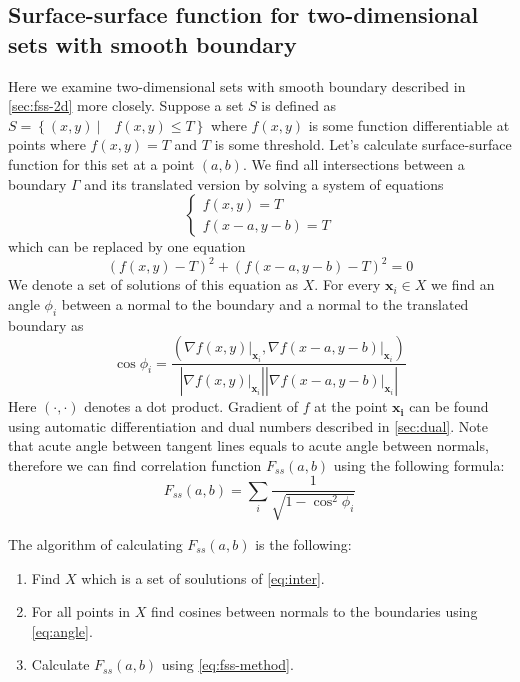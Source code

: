 \documentclass[reprint,amsmath,amssymb,aps,pre,showkeys,showpacs]{revtex4-1}
\begin{document}
\subsection{Surface-surface function for two-dimensional sets with smooth boundary}
\label{sec:cool-algo}
Here we examine two-dimensional sets with smooth boundary described in
\cref{sec:fss-2d} more closely. Suppose a set $S$ is defined as
$S = \left\{ (x, y) \ | \quad f(x, y) \le T \right\}$ where $f(x, y)$ is some function
differentiable at points where $f(x, y) = T$ and $T$ is some threshold. Let's
calculate surface-surface function for this set at a point $(a, b)$. We find all
intersections between a boundary $\Gamma$ and its translated version by solving a
system of equations
\begin{equation*}
  \left\{
  \begin{array}{l}
    f(x, y) = T \\
    f(x-a, y-b) = T    
  \end{array}
  \right.
\end{equation*}
which can be replaced by one equation
\begin{equation}
  (f(x, y) - T)^2 + (f(x-a, y-b) - T)^2 = 0 \label{eq:inter}
\end{equation}
We denote a set of solutions of this equation as $X$. For every $\bm{x}_i \in X$
we find an angle $\phi_i$ between a normal to the boundary and a normal to
the translated boundary as
\begin{equation}
  \cos \phi_i = \frac{(\nabla f(x,y) \vert_{\bm{x}_i}, \nabla f(x-a,y-b)
    \vert_{\bm{x}_i})}{|\nabla f(x,y) \vert_{\bm{x}_i}| |\nabla f(x-a,y-b)
    \vert_{\bm{x}_i}|} \label{eq:angle}
\end{equation}
Here $(\cdot, \cdot)$ denotes a dot product. Gradient of $f$ at the point
$\bm{x_i}$ can be found using automatic differentiation and dual numbers
described in \cref{sec:dual}. Note that acute angle between tangent lines equals
to acute angle between normals, therefore we can find correlation function
$F_{ss}(a, b)$ using the following formula:
\begin{equation}
  F_{ss}(a, b) = \sum_i \frac{1}{\sqrt{1 - \cos^2 \phi_i}} \label{eq:fss-method}
\end{equation}

The algorithm of calculating $F_{ss}(a, b)$ is the following:
\begin{enumerate}
\item Find $X$ which is a set of soulutions of \cref{eq:inter}.
\item For all points in $X$ find cosines between normals to the boundaries using
  \cref{eq:angle}.
\item Calculate $F_{ss}(a, b)$ using \cref{eq:fss-method}.
\end{enumerate}
\end{document}
